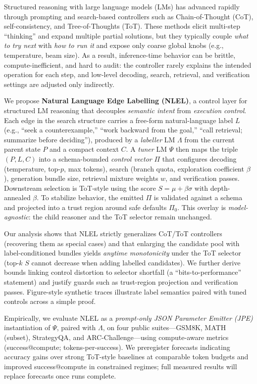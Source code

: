 \documentclass{article}
\theoremstyle{plain}
\theoremstyle{definition}
\theoremstyle{remark}
\begin{document}
Structured reasoning with large language models (LMs) has advanced rapidly through prompting and search-based controllers such as Chain-of-Thought (CoT), self-consistency, and Tree-of-Thoughts (ToT). These methods elicit multi-step ``thinking'' and expand multiple partial solutions, but they typically couple \emph{what to try next} with \emph{how to run it} and expose only coarse global knobs (e.g., temperature, beam size). As a result, inference-time behavior can be brittle, compute-inefficient, and hard to audit: the controller rarely explains the intended operation for each step, and low-level decoding, search, retrieval, and verification settings are adjusted only indirectly.

We propose \textbf{Natural Language Edge Labelling (NLEL)}, a control layer for structured LM reasoning that decouples \emph{semantic intent} from \emph{execution control}. Each edge in the search structure carries a free-form natural-language label $L$ (e.g., ``seek a counterexample,'' ``work backward from the goal,'' ``call retrieval; summarize before deciding''), produced by a \emph{labeller} LM \(\Lambda\) from the current parent state \(P\) and a compact context \(C\). A \emph{tuner} LM \(\Psi\) then maps the triple \((P,L,C)\) into a schema-bounded \emph{control vector} \(\Pi\) that configures decoding (temperature, top-\(p\), max tokens), search (branch quota, exploration coefficient \(\beta\)), generation bundle size, retrieval mixture weights \(w\), and verification passes. Downstream selection is ToT-style using the score \(S=\mu+\beta\sigma\) with depth-annealed \(\beta\). To stabilize behavior, the emitted \(\Pi\) is validated against a schema and projected into a trust region around safe defaults \(\Pi_{0}\). This overlay is \emph{model-agnostic}: the child reasoner and the ToT selector remain unchanged.

Our analysis shows that NLEL strictly generalizes CoT/ToT controllers (recovering them as special cases) and that enlarging the candidate pool with label-conditioned bundles yields \emph{anytime monotonicity} under the ToT selector (top-\(k\) \(S\) cannot decrease when adding labelled candidates). We further derive bounds linking control distortion to selector shortfall (a ``bits-to-performance'' statement) and justify guards such as trust-region projection and verification passes. Figure-style synthetic traces illustrate label semantics paired with tuned controls across a simple proof.

Empirically, we evaluate NLEL as a \emph{prompt-only JSON Parameter Emitter (JPE)} instantiation of \(\Psi\), paired with \(\Lambda\), on four public suites---GSM8K, MATH (subset), StrategyQA, and ARC-Challenge---using compute-aware metrics (success@compute; tokens-per-success). We preregister forecasts indicating accuracy gains over strong ToT-style baselines at comparable token budgets and improved success@compute in constrained regimes; full measured results will replace forecasts once runs complete.
\end{document}
